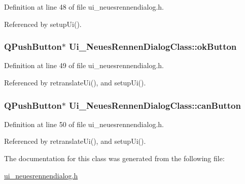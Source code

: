 Definition at line 48 of file ui\_\-neuesrennendialog.h.

Referenced by setupUi().\hypertarget{class_ui___neues_rennen_dialog_class_914caf299025ede811950554f59fffcd}{
\subsubsection[okButton]{\setlength{\rightskip}{0pt plus 5cm}QPushButton$\ast$ {\bf Ui\_\-NeuesRennenDialogClass::okButton}}}
\label{class_ui___neues_rennen_dialog_class_914caf299025ede811950554f59fffcd}




Definition at line 49 of file ui\_\-neuesrennendialog.h.

Referenced by retranslateUi(), and setupUi().\hypertarget{class_ui___neues_rennen_dialog_class_ac096d5a91439616d9091ef583e4d4be}{
\subsubsection[canButton]{\setlength{\rightskip}{0pt plus 5cm}QPushButton$\ast$ {\bf Ui\_\-NeuesRennenDialogClass::canButton}}}
\label{class_ui___neues_rennen_dialog_class_ac096d5a91439616d9091ef583e4d4be}




Definition at line 50 of file ui\_\-neuesrennendialog.h.

Referenced by retranslateUi(), and setupUi().

The documentation for this class was generated from the following file:\begin{CompactItemize}
\item 
\hyperlink{ui__neuesrennendialog_8h}{ui\_\-neuesrennendialog.h}\end{CompactItemize}
